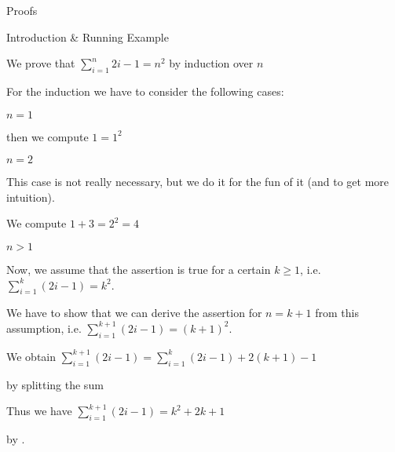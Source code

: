 \begin{sfragment}{Proofs}
\begin{sfragment}{Introduction \& Running Example}
\begin{mdframed}
  \begin{sproof}[id=simple-proof]
  {We prove that $\sum_{i=1}^n{2i-1}=n^{2}$ by induction over $n$}
  \begin{spfcases}{For the induction we have to consider the following cases:}
    \begin{spfcase}{$n=1$}
      \begin{spfstep}[type=inline] then we compute $1=1^2$\end{spfstep}
    \end{spfcase}
    \begin{spfcase}{$n=2$}
      \begin{sproofcomment}[type=inline]
         This case is not really necessary, but we do it for the fun
         of it (and to get more intuition).
      \end{sproofcomment}
      \begin{spfstep}[type=inline]
         We compute $1+3=2^{2}=4$
      \end{spfstep}
    \end{spfcase}
    \begin{spfcase}{$n>1$}
      \begin{spfstep}[type=hypothesis,id=ind-hyp]
        Now, we assume that the assertion is true for a certain $k\geq 1$, i.e.
        $\sum_{i=1}^k{(2i-1)}=k^{2}$.
      \end{spfstep}
      \begin{sproofcomment}
        We have to show that we can derive the assertion for $n=k+1$ from this
        assumption, i.e.  $\sum_{i=1}^{k+1}{(2i-1)}=(k+1)^{2}$.
      \end{sproofcomment}
      \begin{spfstep}[id=splitit]
        We obtain $\sum_{i=1}^{k+1}{(2i-1)}=\sum_{i=1}^k{(2i-1)}+2(k+1)-1$
       \begin{justification}[method=arith:split-sum]
         by splitting the sum
       \end{justification}
     \end{spfstep}
     \begin{spfstep}[id=byindhyp]
       Thus we have $\sum_{i=1}^{k+1}{(2i-1)}=k^2+2k+1$
       \begin{justification}[method=fertilize]
         by .
       \end{justification}
     \end{spfstep}
     \begin{spfstep}[type=conclusion]

\end{spfstep}
\end{spfcase}
\end{spfcases}
\end{sproof}
\end{mdframed}
\end{sfragment}
\end{sfragment}

